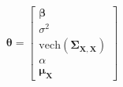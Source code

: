 \begin{equation}
	\boldsymbol{\theta}
	=
	\left[
		\begin{array}{c}
			\boldsymbol{\beta}                                                        \\
			\sigma^2                                                                  \\
			\mathrm{vech} \left( \boldsymbol{\Sigma}_{\mathbf{X}, \mathbf{X}} \right) \\
			\alpha                                                                    \\
			\boldsymbol{\mu}_{\mathbf{X}}                                             
		\end{array}
	\right]
	\label{strRegression-theta-mcsa}
\end{equation}
